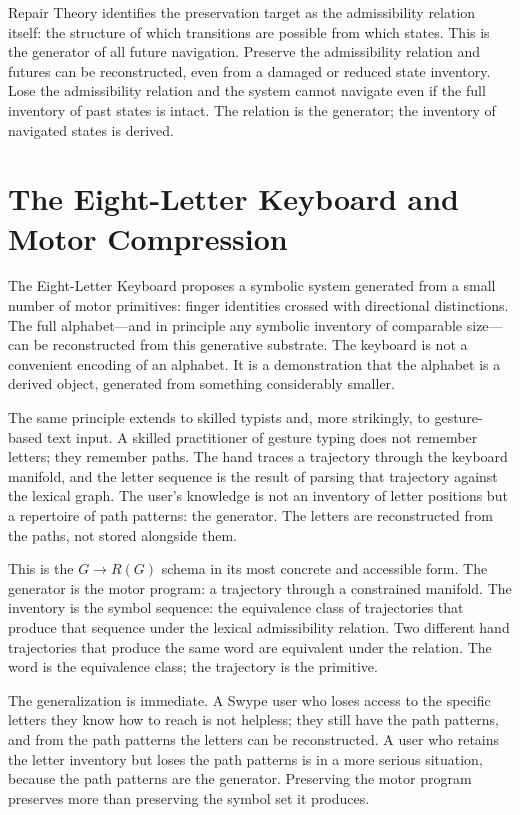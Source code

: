 \documentclass[12pt, oneside]{book}
\theoremstyle{flyxion}
\theoremstyle{definition}
\begin{document}
Repair Theory identifies the preservation target as the admissibility
relation itself: the structure of which transitions are possible from
which states. This is the generator of all future navigation.
Preserve the admissibility relation and futures can be reconstructed,
even from a damaged or reduced state inventory. Lose the admissibility
relation and the system cannot navigate even if the full inventory
of past states is intact. The relation is the generator; the
inventory of navigated states is derived.

\section{The Eight-Letter Keyboard and Motor Compression}

The Eight-Letter Keyboard proposes a symbolic system generated from
a small number of motor primitives: finger identities crossed with
directional distinctions. The full alphabet---and in principle any
symbolic inventory of comparable size---can be reconstructed from
this generative substrate. The keyboard is not a convenient encoding
of an alphabet. It is a demonstration that the alphabet is a derived
object, generated from something considerably smaller.

The same principle extends to skilled typists and, more strikingly,
to gesture-based text input. A skilled practitioner of gesture
typing does not remember letters; they remember paths. The hand
traces a trajectory through the keyboard manifold, and the letter
sequence is the result of parsing that trajectory against the
lexical graph. The user's knowledge is not an inventory of letter
positions but a repertoire of path patterns: the generator. The
letters are reconstructed from the paths, not stored alongside them.

This is the $G \to R(G)$ schema in its most concrete and accessible
form. The generator is the motor program: a trajectory through a
constrained manifold. The inventory is the symbol sequence: the
equivalence class of trajectories that produce that sequence under
the lexical admissibility relation. Two different hand trajectories
that produce the same word are equivalent under the relation. The
word is the equivalence class; the trajectory is the primitive.

The generalization is immediate. A Swype user who loses access to
the specific letters they know how to reach is not helpless; they
still have the path patterns, and from the path patterns the letters
can be reconstructed. A user who retains the letter inventory but
loses the path patterns is in a more serious situation, because the
path patterns are the generator. Preserving the motor program
preserves more than preserving the symbol set it produces.
\end{document}
